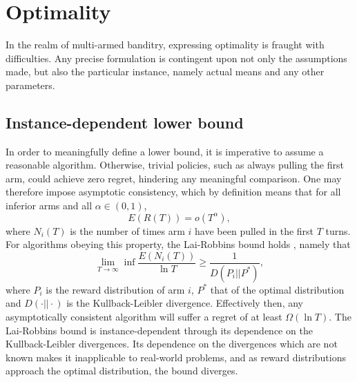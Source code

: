 \section{Optimality}
In the realm of multi-armed banditry, expressing optimality is fraught with difficulties.
Any precise formulation is contingent upon not only the assumptions made, but also the particular instance, namely actual means and any other parameters.

\subsection{Instance-dependent lower bound}
In order to meaningfully define a lower bound, it is imperative to assume a reasonable algorithm.
Otherwise, trivial policies, such as always pulling the first arm, could achieve zero regret, hindering any meaningful comparison.
One may therefore impose asymptotic consistency, which by definition means that for all inferior arms and all $\alpha \in (0, 1)$,
\begin{equation}
    E(R(T)) = o(T^{\alpha}),
\end{equation}
where $N_i(T)$ is the number of times arm $i$ have been pulled in the first $T$ turns.
For algorithms obeying this property, the Lai-Robbins bound holds \cite{lai1985}, namely that
\begin{equation}
    \lim_{T\to\infty} \inf \frac{E(N_i(T))}{\ln T} \geq \frac{1}{D(P_i || P^*)},
\end{equation}
where $P_i$ is the reward distribution of arm $i$, $P^*$ that of the optimal distribution and $D(\cdot || \cdot)$ is the Kullback-Leibler divergence.
Effectively then, any asymptotically consistent algorithm will suffer a regret of at least $\Omega(\ln T)$.
The Lai-Robbins bound is instance-dependent through its dependence on the Kullback-Leibler divergences.
Its dependence on the divergences which are not known makes it inapplicable to real-world problems, and as reward distributions approach the optimal distribution, the bound diverges.

